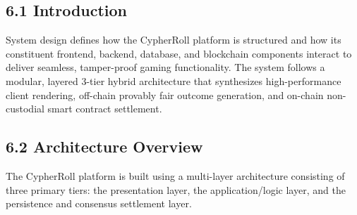 \vspace{1.0cm}
\par
\label{chap:design}
\vspace{0.15cm}
\par
\vspace{0.3cm}

\subsection*{6.1 Introduction}
System design defines how the CypherRoll platform is structured and how its constituent frontend, backend, database, and blockchain components interact to deliver seamless, tamper-proof gaming functionality. The system follows a modular, layered 3-tier hybrid architecture that synthesizes high-performance client rendering, off-chain provably fair outcome generation, and on-chain non-custodial smart contract settlement.

\subsection*{6.2 Architecture Overview}
The CypherRoll platform is built using a multi-layer architecture consisting of three primary tiers: the presentation layer, the application/logic layer, and the persistence and consensus settlement layer.

